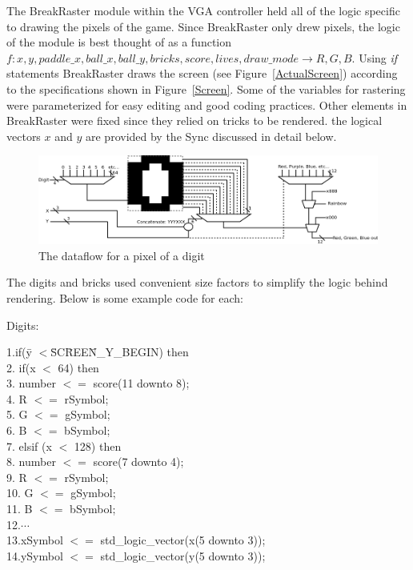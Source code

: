 \documentclass[conference]{IEEEtran}
\begin{document}
The BreakRaster module within the VGA controller held all of the logic specific to drawing the pixels of the game. Since BreakRaster only drew pixels, the logic of the module is best thought of as a function $f: x, y, paddle\_x, ball\_x, ball\_y, bricks, score, \allowbreak lives,\allowbreak draw\_mode \allowbreak \rightarrow R, G, B$. Using \emph{if} statements BreakRaster draws the screen (see Figure~\ref{ActualScreen}) according to the specifications shown in Figure~\ref{Screen}. Some of the variables for rastering were parameterized for easy editing and good coding practices. Other elements in BreakRaster were fixed since they relied on tricks to be rendered. the logical vectors $x$ and $y$ are provided by the Sync discussed in detail below.

\begin{figure}[!t]
\centering
\includegraphics[width=7in]{Digit}
\caption{The dataflow for a pixel of a digit}
\label{Digit}
\end{figure}

The digits and bricks used convenient size factors to simplify the logic behind rendering. Below is some example code for each:

Digits:
\begin{tabbing}
1.if(\=y $<$\= SC\=REE\=N\_Y\_BEGIN) then\\
2.\>    if(x $<$ 64) then\\
3.\>\>      number $<=$ score(11 downto 8);\\			
4.\>\>		R $<=$ rSymbol;\\
5.\>\>		G $<=$ gSymbol;\\
6.\>\>		B $<=$ bSymbol;\\
7.\>	elsif (x $<$ 128) then\\
8.\>\>		number $<=$ score(7 downto 4);\\
9.\>\>		R $<=$ rSymbol;\\
10.\>\>		G $<=$ gSymbol;\\
11.\>\>		B $<=$ bSymbol;\\
12.\>\>\>$\cdots$\\
13.xSymbol $<=$ std\_logic\_vector(x(5 downto 3));\\
14.ySymbol $<=$ std\_logic\_vector(y(5 downto 3));\\
\end{tabbing}
\end{document}
